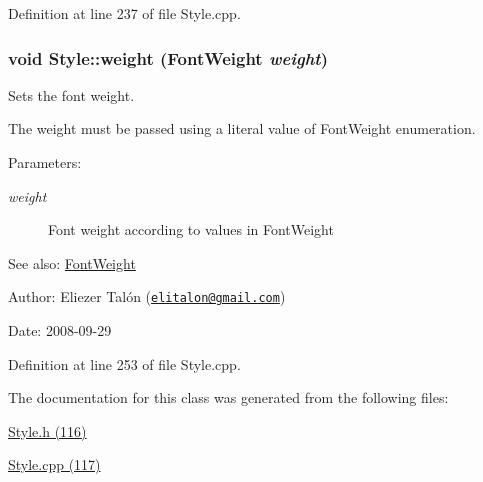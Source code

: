 Definition at line 237 of file Style.cpp.\hypertarget{class_style_f1273b59bdfe98b24410177f1eea7732}{
\subsubsection[weight]{\setlength{\rightskip}{0pt plus 5cm}void Style::weight ({\bf FontWeight} {\em weight})}}
\label{class_style_f1273b59bdfe98b24410177f1eea7732}


Sets the font weight. 

The weight must be passed using a literal value of FontWeight enumeration.

\begin{Desc}
\item[Parameters:]
\begin{description}
\item[{\em weight}]Font weight according to values in FontWeight\end{description}
\end{Desc}
\begin{Desc}
\item[See also:]\hyperlink{_font_weight_8h_ecff23ba4a68486421bcea57e095fe66}{FontWeight}\end{Desc}
\begin{Desc}
\item[Author:]Eliezer Talón (\href{mailto:elitalon@gmail.com}{\tt elitalon@gmail.com}) \end{Desc}
\begin{Desc}
\item[Date:]2008-09-29 \end{Desc}


Definition at line 253 of file Style.cpp.

The documentation for this class was generated from the following files:\begin{CompactItemize}
\item 
\hyperlink{_style_8h}{Style.h (116)}\item 
\hyperlink{_style_8cpp}{Style.cpp (117)}\end{CompactItemize}
